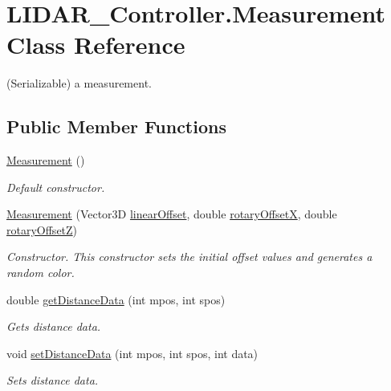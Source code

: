 \hypertarget{class_l_i_d_a_r___controller_1_1_measurement}{}\section{L\+I\+D\+A\+R\+\_\+\+Controller.\+Measurement Class Reference}
\label{class_l_i_d_a_r___controller_1_1_measurement}


(Serializable) a measurement.  


\subsection*{Public Member Functions}
\begin{DoxyCompactItemize}
\item 
\hyperlink{class_l_i_d_a_r___controller_1_1_measurement_a626783b871e193bdf1c058ffdc11a6ef}{Measurement} ()
\begin{DoxyCompactList}\small\item\em Default constructor. \end{DoxyCompactList}\item 
\hyperlink{class_l_i_d_a_r___controller_1_1_measurement_a44861f2c7f664d1f51e48f658760c664}{Measurement} (Vector3D \hyperlink{class_l_i_d_a_r___controller_1_1_measurement_a00cfc32b350bb7516008ec96ad557f8d}{linear\+Offset}, double \hyperlink{class_l_i_d_a_r___controller_1_1_measurement_a26ac087dbaf4f45ee4550cf5668ae4ff}{rotary\+OffsetX}, double \hyperlink{class_l_i_d_a_r___controller_1_1_measurement_aeb96de05257dd310531350f3af1eb47e}{rotary\+OffsetZ})
\begin{DoxyCompactList}\small\item\em Constructor. This constructor sets the initial offset values and generates a random color. \end{DoxyCompactList}\item 
double \hyperlink{class_l_i_d_a_r___controller_1_1_measurement_a1fc45f8d577ed5fe5da313bb0a695127}{get\+Distance\+Data} (int mpos, int spos)
\begin{DoxyCompactList}\small\item\em Gets distance data. \end{DoxyCompactList}\item 
void \hyperlink{class_l_i_d_a_r___controller_1_1_measurement_a929590bf97ba820bc51db6ffa931d550}{set\+Distance\+Data} (int mpos, int spos, int data)
\begin{DoxyCompactList}\small\item\em Sets distance data. \end{DoxyCompactList}\item 

\end{DoxyCompactItemize}

